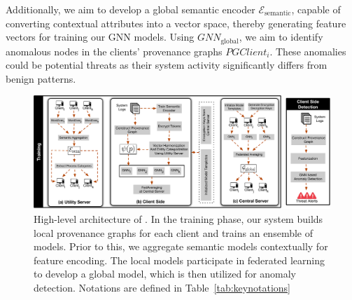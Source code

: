 Additionally, we aim to develop a global semantic encoder \( \mathcal{E}_{\text{semantic}} \), capable of converting contextual attributes into a vector space, thereby generating feature vectors for training our GNN models. Using \( {GNN}_{\text{global}} \), we aim to identify anomalous nodes in the clients' provenance graphs \( PGClient_{i}\). These anomalies could be potential threats as their system activity significantly differs from benign patterns.

\begin{figure}[t!]
  \centering
  \includegraphics[width=1\textwidth]{fig/archv3.pdf}
  \caption{High-level architecture of \Sys. In the training phase, our system builds local provenance graphs for each client and trains an ensemble of \gnnshort models. Prior to this, we aggregate semantic models contextually for feature encoding. The local \gnnshort models participate in federated learning to develop a global \gnnshort model, which is then utilized for anomaly detection. Notations are defined in Table~\ref{tab:keynotations}}
  \vspace{-3ex}
  \label{fig:arch}
\end{figure}


  



